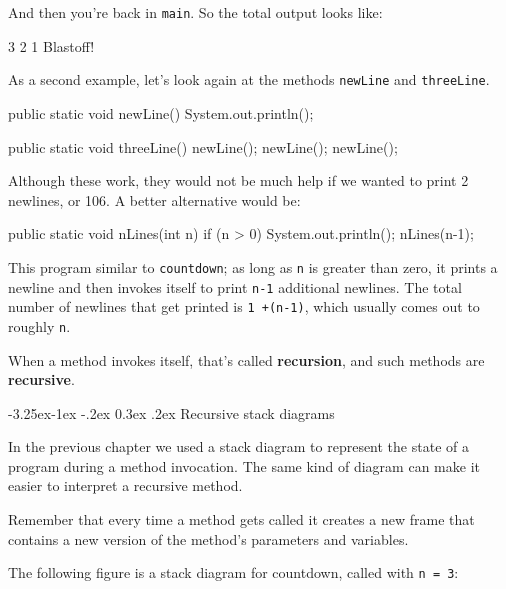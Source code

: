 \documentclass[12pt]{book}
\makeatletter
\renewcommand\subsection{\@startsection{subsection}{2}{\z@}%
    {-3.25ex\@plus -1ex \@minus -.2ex}%
    {0.3ex \@plus .2ex}%
    {\normalfont\large\bfseries}}
\theoremstyle{exercise}
\makeatother
\begin{document}
\noindent And then you're back in {\tt main}.
So the total output looks like:

\begin{stdout}
3
2
1
Blastoff!
\end{stdout}

As a second example, let's look again at the methods {\tt newLine} and {\tt threeLine}.

\begin{code}
    public static void newLine() {
        System.out.println();
    }

    public static void threeLine() {
        newLine();
        newLine();
        newLine();
    }
\end{code}

Although these work, they would not be much help if we wanted to print 2 newlines, or 106.
A better alternative would be:

\begin{code}
    public static void nLines(int n) {
        if (n > 0) {
            System.out.println();
            nLines(n-1);
        }
    }
\end{code}

This program similar to {\tt countdown}; as long as {\tt n} is greater than zero, it prints a newline and then invokes itself to print {\tt n-1} additional newlines.
The total number of newlines that get printed is {\tt 1 +(n-1)}, which usually comes out to roughly {\tt n}.


When a method invokes itself, that's called {\bf recursion}, and such methods are {\bf recursive}.

\subsection{Recursive stack diagrams}


In the previous chapter we used a stack diagram to represent the state of a program during a method invocation.
The same kind of diagram can make it easier to interpret a recursive method.

Remember that every time a method gets called it creates a new frame that contains a new version of the method's parameters and variables.

The following figure is a stack diagram for countdown, called with {\tt n = 3}:
\end{document}
